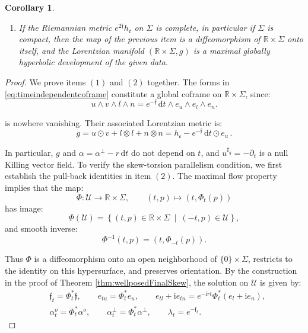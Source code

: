 \documentclass[10pt,reqno,a4paper]{amsart}
\theoremstyle{plain}
\newtheorem{cor}[thm]{Corollary}
\theoremstyle{definition}
\theoremstyle{remark}
\theoremstyle{remark}
\def\dd{\mathrm{d}}
\def\cU{\mathcal{U}}
\def\fre{\mathfrak{e}}
\renewcommand{\(}{ (}
\renewcommand{\)}{ )}
\newcommand{\frf}{\mathfrak{f}}
\begin{document}
\begin{cor}
\begin{enumerate}
\item If the Riemannian metric $e^{2\frf} h_{\fre}$ on $\Sigma$ is complete, in particular if $\Sigma$ is compact, then the map of the previous item is a diffeomorphism of $\mathbb{R}\times\Sigma$ onto itself, and the Lorentzian manifold $(\mathbb{R}\times \Sigma , g)$ is a maximal globally hyperbolic development of the given data.  
\end{enumerate}
\end{cor}

\begin{proof} 
We prove items $(1)$ and $(2)$ together. The forms in \eqref{eq:timeindependentcoframe} constitute a global coframe on $\mathbb R\times\Sigma$, since:
\begin{equation*}
u\wedge v\wedge l\wedge n
=
e^{-\frf}\,\dd t\wedge e_u\wedge e_l\wedge e_n.
\end{equation*}

\noindent
is nowhere vanishing. Their associated Lorentzian metric is:
\begin{equation*}
g = u\odot v+l\otimes l+n\otimes n = h_{\fre} - e^{-\frf}\,\dd t\odot e_u\, .
\end{equation*}

\noindent
In particular, $g$ and $\alpha=\alpha^{\perp}-r\,\dd t$ do not depend on $t$, and $u^{\sharp_g}=-\partial_t$ is a null Killing vector field. To verify the skew-torsion parallelism condition, we first establish the pull-back identities in item $(2)$. The maximal flow property implies that the map:
\begin{equation*}
\Phi\colon\cU\longrightarrow\mathbb R\times\Sigma,
\qquad
(t,p)\longmapsto(t,\Phi_t(p))
\end{equation*}
has image:
\begin{equation*}
\Phi(\cU)
=
\left\{(t,p)\in\mathbb R\times\Sigma
\ \middle|\ (-t,p)\in\cU\right\},
\end{equation*}
and smooth inverse:
\begin{equation*}
\Phi^{-1}(t,p)=(t,\Phi_{-t}(p)).
\end{equation*}

\noindent
Thus $\Phi$ is a diffeomorphism onto an open neighborhood of $\{0\}\times\Sigma$, restricts to the identity on this hypersurface, and preserves orientation. By the construction in the proof of Theorem \ref{thm:wellposedFinalSkew}, the solution on $\cU$ is given by:
\begin{eqnarray*}
& \frf_t=\Phi_t^{\ast}\frf,
\qquad
e_{tu}=\Phi_t^{\ast}e_u,
\qquad
e_{tl}+\mathrm{i}e_{tn}
=
e^{-\mathrm{i}rt}\Phi_t^{\ast}(e_l+\mathrm{i}e_n),\\
& \alpha_t^o=\Phi_t^{\ast}\alpha^o,
\qquad
\alpha_t^{\perp}=\Phi_t^{\ast}\alpha^{\perp},
\qquad
\lambda_t=e^{-\frf_t}.
\end{eqnarray*}


\end{proof}
\end{document}
